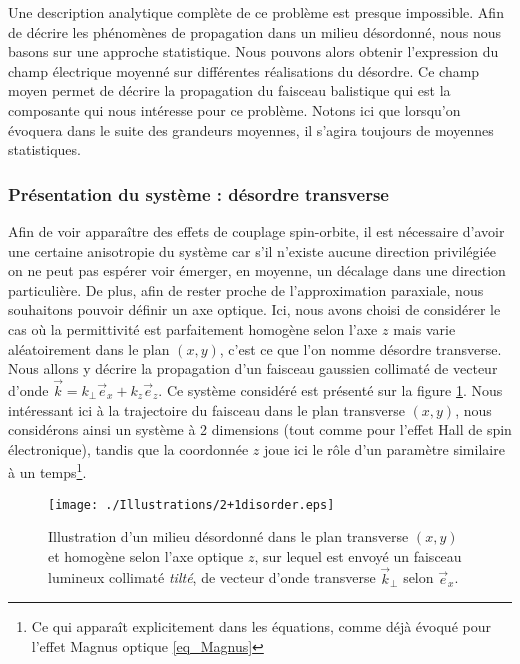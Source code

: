 \documentclass[a4paper,11pt]{article} %
\begin{document}
	Une description analytique complète de ce problème est presque impossible. Afin de décrire les phénomènes de propagation dans un milieu désordonné, nous nous basons sur une approche statistique. Nous pouvons alors obtenir l'expression du champ électrique moyenné sur différentes réalisations du désordre. Ce champ moyen permet de décrire la propagation du faisceau balistique qui est la composante qui nous intéresse pour ce problème. Notons ici que lorsqu'on évoquera dans le suite des grandeurs moyennes, il s'agira toujours de moyennes statistiques.
	
	
	\subsubsection{Présentation du système : désordre transverse}
	

	Afin de voir apparaître des effets de couplage spin-orbite, il est nécessaire d'avoir une certaine anisotropie du système car s'il n'existe aucune direction privilégiée on ne peut pas espérer voir émerger, en moyenne, un décalage dans une direction particulière. De plus, afin de rester proche de l'approximation paraxiale, nous souhaitons pouvoir définir un axe optique. Ici, nous avons choisi de considérer le cas où la permittivité est parfaitement homogène selon l'axe $ z $ mais varie aléatoirement dans le plan $ (x,y) $, c'est ce que l'on nomme désordre transverse. Nous allons y décrire la propagation d'un faisceau gaussien collimaté de vecteur d'onde $ \vec{k} = k_\perp \vec{e}_x + k_z \vec{e}_z $. Ce système considéré est présenté sur la figure \ref{fig:systeme_desordre_transverse}. %
	Nous intéressant ici à la trajectoire du faisceau dans le plan transverse $ (x,y) $, nous considérons ainsi un système à 2 dimensions (tout comme pour l'effet Hall de spin électronique), tandis que la coordonnée $ z $ joue ici le rôle d'un paramètre similaire à un temps\footnote{Ce qui apparaît explicitement dans les équations, comme déjà évoqué pour l'effet Magnus optique \eqref{eq_Magnus}}.\\
	
	\begin{figure}[h]
		\centering
		\begin{minipage}[c]{0.85\linewidth}
			\centering
			\texttt{[image: ./Illustrations/2+1disorder.eps]}
			\caption{Illustration d'un milieu désordonné dans le plan transverse $ (x,y) $ et homogène selon l'axe optique $ z $, sur lequel est envoyé un faisceau lumineux collimaté \textit{tilté}, de vecteur d'onde transverse $ \vec{k}_\perp $ selon $ \vec{e}_x $.}
			\label{fig:systeme_desordre_transverse}
		\end{minipage}
	\end{figure}
\end{document}
